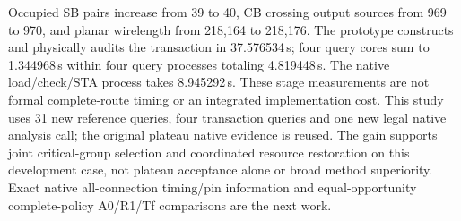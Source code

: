 Occupied SB pairs increase from 39 to 40, CB crossing output sources from 969 to 970, and planar wirelength from 218,164 to 218,176. The prototype constructs and physically audits the transaction in 37.576534\,s; four query cores sum to 1.344968\,s within four query processes totaling 4.819448\,s. The native load/check/STA process takes 8.945292\,s. These stage measurements are not formal complete-route timing or an integrated implementation cost. This study uses 31 new reference queries, four transaction queries and one new legal native analysis call; the original plateau native evidence is reused. The gain supports joint critical-group selection and coordinated resource restoration on this development case, not plateau acceptance alone or broad method superiority. Exact native all-connection timing/pin information and equal-opportunity complete-policy A0/R1/Tf comparisons are the next work.
